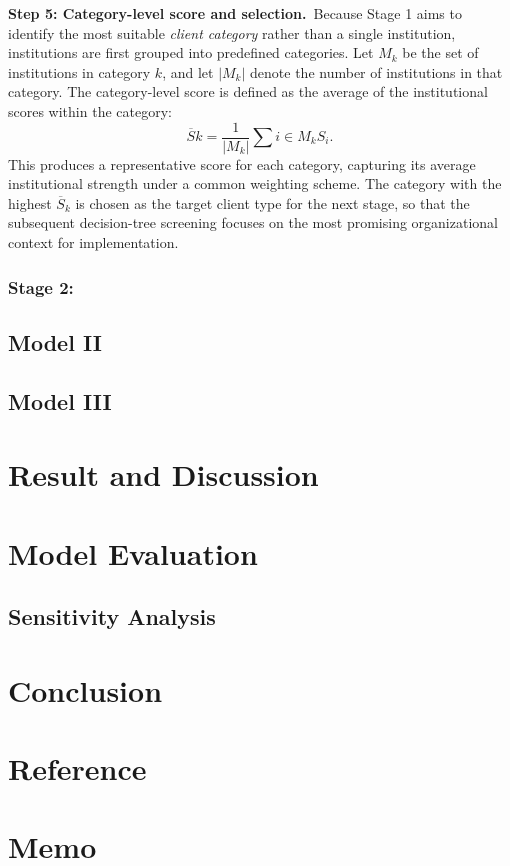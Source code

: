 \documentclass{mcmthesis}
\begin{document}
\vspace{0.5\baselineskip} \textbf{Step 5: Category-level score and selection.}\ Because Stage 1 aims to identify the most suitable \emph{client category} rather than a single institution, institutions are first grouped into predefined categories. Let $M_k$ be the set of institutions in category $k$, and let $|M_k|$ denote the number of institutions in that category. The category-level score is defined as the average of the institutional scores within the category: \begin{equation} \overline{S}k = \frac{1}{|M_k|} \sum{i \in M_k} S_i. \end{equation} This produces a representative score for each category, capturing its average institutional strength under a common weighting scheme. The category with the highest $\overline{S}_k$ is chosen as the target client type for the next stage, so that the subsequent decision-tree screening focuses on the most promising organizational context for implementation.

\subsubsection{Stage 2: }


\subsection{Model II}
\subsection{Model III}

\section{Result and Discussion}

\section{Model Evaluation}
\subsection{Sensitivity Analysis}

\section{Conclusion}

\section{Reference}

\section{Memo}
\end{document}
